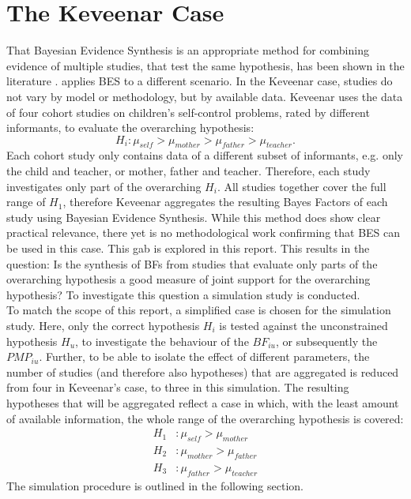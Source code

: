 \documentclass[12pt]{article}
\begin{document}
\section{The Keveenar Case}
That Bayesian Evidence Synthesis is an appropriate method for combining evidence of multiple studies, that test the same hypothesis, has been shown in the literature \citep{klugkist_bayesian_2023, kuiper_combining_2012, van_wonderen_bayesian_2024, volker_combining_2023}. \cite{kevenaar_bayesian_2021} applies BES to a different scenario. In the Keveenar case, studies do not vary by model or methodology, but by available data. Keveenar uses the data of four cohort studies on children’s self-control problems, rated by different informants, to evaluate the overarching hypothesis:
\begin{equation*}
    H_i: \mu_{self} > \mu_{mother} > \mu_{father} > \mu_{teacher}.
\end{equation*}
Each cohort study only contains data of a different subset of informants, e.g. only the child and teacher, or mother, father and teacher. Therefore, each study investigates only part of the overarching $H_i$. All studies together cover the full range of $H_1$, therefore Keveenar aggregates the resulting Bayes Factors of each study using Bayesian Evidence Synthesis. While this method does show clear practical relevance, there yet is no methodological work confirming that BES can be used in this case. This gab is explored in this report. This results in the question: Is the synthesis of BFs from studies that evaluate only parts of the overarching hypothesis a good measure of joint support for the overarching hypothesis? To investigate this question a simulation study is conducted. \\
To match the scope of this report, a simplified case is chosen for the simulation study. Here, only the correct hypothesis $H_i$ is tested against the unconstrained hypothesis $H_u$, to investigate the behaviour of the $BF_{iu}$, or subsequently the $PMP_{iu}$. Further, to be able to isolate the effect of different parameters, the number of studies (and therefore also hypotheses) that are aggregated is reduced from four in Keveenar's case, to three in this simulation. The resulting hypotheses that will be aggregated reflect a case in which, with the least amount of available information, the whole range of the overarching hypothesis is covered:
\begin{align*}
    H_1 &: \mu_{self} > \mu_{mother} \\
    H_2 &: \mu_{mother} > \mu_{father} \\
    H_3 &: \mu_{father} > \mu_{teacher}
\end{align*}
The simulation procedure is outlined in the following section.
\end{document}
